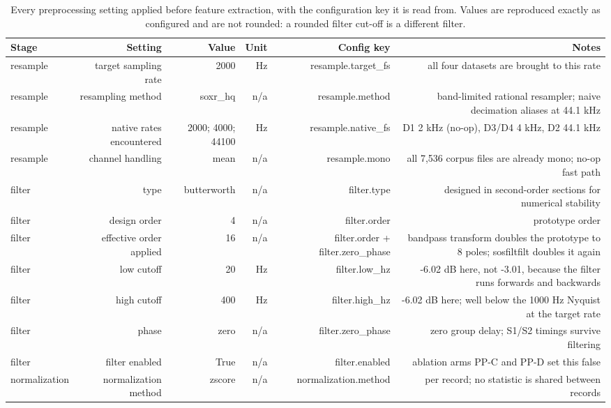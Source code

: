 \begin{table}[htbp]
  \centering
  \caption{Every preprocessing setting applied before feature extraction, with the configuration key it is read from. Values are reproduced exactly as configured and are not rounded: a rounded filter cut-off is a different filter.}
  \label{tab:t04}
  \begin{tabular}{lrrrrr}
    \toprule
    Stage & Setting & Value & Unit & Config key & Notes \\
    \midrule
    resample & target sampling rate & 2000 & Hz & resample.target\_fs & all four datasets are brought to this rate \\
    resample & resampling method & soxr\_hq & n/a & resample.method & band-limited rational resampler; naive decimation aliases at 44.1 kHz \\
    resample & native rates encountered & 2000; 4000; 44100 & Hz & resample.native\_fs & D1 2 kHz (no-op), D3/D4 4 kHz, D2 44.1 kHz \\
    resample & channel handling & mean & n/a & resample.mono & all 7,536 corpus files are already mono; no-op fast path \\
    filter & type & butterworth & n/a & filter.type & designed in second-order sections for numerical stability \\
    filter & design order & 4 & n/a & filter.order & prototype order \\
    filter & effective order applied & 16 & n/a & filter.order + filter.zero\_phase & bandpass transform doubles the prototype to 8 poles; sosfiltfilt doubles it again \\
    filter & low cutoff & 20 & Hz & filter.low\_hz & -6.02 dB here, not -3.01, because the filter runs forwards and backwards \\
    filter & high cutoff & 400 & Hz & filter.high\_hz & -6.02 dB here; well below the 1000 Hz Nyquist at the target rate \\
    filter & phase & zero & n/a & filter.zero\_phase & zero group delay; S1/S2 timings survive filtering \\
    filter & filter enabled & True & n/a & filter.enabled & ablation arms PP-C and PP-D set this false \\
    normalization & normalization method & zscore & n/a & normalization.method & per record; no statistic is shared between records \\

\end{tabular}
\end{table}
